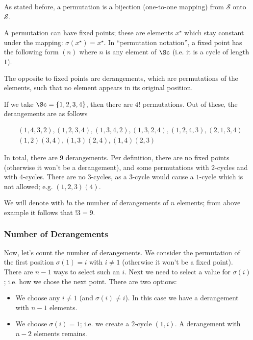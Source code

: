 
As stated before, a permutation is a bijection (one-to-one mapping) from $\mathcal{S}$ onto $\mathcal{S}$.

A permutation can have fixed points; these are elements $x^\star$ which stay constant under the mapping: $\sigma(x^\star) = x^\star$. In ``permutation notation'', a fixed point has the following form $(n)$ where $n$ is any element of $\Sc$ (i.e. it is a cycle of length $1$).

The opposite to fixed points are derangements, which are permutations of the elements, such that no element appears in its original position.

If we take $\Sc = \{1,2,3,4\}$, then there are $4!$ permutations. Out of these, the derangements are as follows

\begin{align}
    & (1,4,3,2), (1,2,3,4), (1,3,4,2), (1,3,2,4), (1,2,4,3), (2,1,3,4) \nonumber \\
    & (1,2)(3,4), (1,3)(2,4), (1,4)(2,3)
        \label{2015-12-26:eq1}
\end{align}

In total, there are $9$ derangements. Per definition, there are no fixed points (otherwise it won't be a derangement), and some permutations with $2$-cycles and with $4$-cycles. There are no $3$-cycles, as a $3$-cycle would cause a $1$-cycle which is not allowed; e.g. $(1,2,3)(4)$.

We will denote with $!n$ the number of derangements of $n$ elements; from above example it follows that $!3 = 9$.

\subsubsection{Number of Derangements}

Now, let's count the number of derangements. We consider the permutation of the first position $\sigma(1) = i$ with $i \neq 1$ (otherwise it won't be a fixed point). There are $n-1$ ways to select such an $i$. Next we need to select a value for $\sigma(i)$; i.e. how we chose the next point. There are two options:

\begin{itemize}
    \item We choose any $i \neq 1$ (and $\sigma(i) \neq i$). In this case we have a derangement with $n-1$ elements.
    \item We choose $\sigma(i)=1$; i.e. we create a $2$-cycle $(1,i)$. A derangement with $n-2$ elements remains.
\end{itemize}

